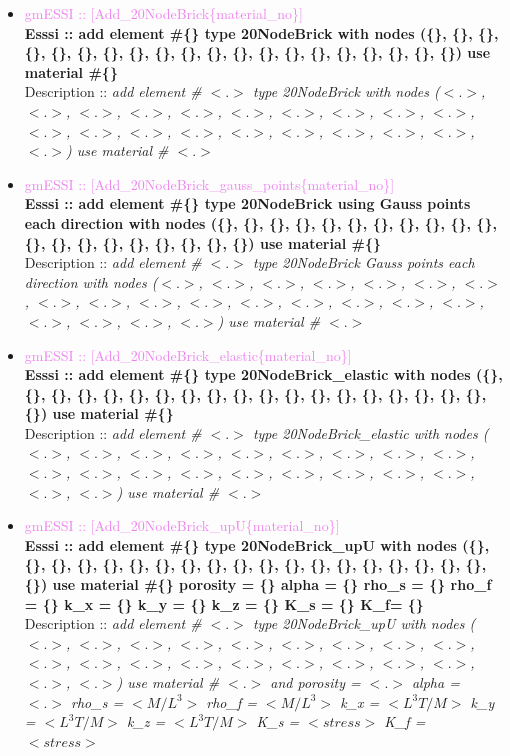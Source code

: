 \documentclass[11pt]{article}
\begin{document}
  \begin{itemize}

    \item \textcolor{violet}{gmESSI :: [Add\_20NodeBrick\{material\_no\}]} \\             
    \textbf{Esssi :: add element \#\{\} type 20NodeBrick with nodes (\{\}, \{\}, \{\}, \{\}, \{\}, \{\}, \{\}, \{\}, \{\}, \{\}, \{\}, \{\}, \{\}, \{\}, \{\}, \{\}, \{\}, \{\}, \{\}, \{\}) use material \#\{\}}\\
    Description :: \textit{ add element \# $<.>$ type 20NodeBrick with nodes ($<.>$, $<.>$, $<.>$, $<.>$, $<.>$, $<.>$, $<.>$, $<.>$, $<.>$, $<.>$, $<.>$, $<.>$, $<.>$, $<.>$, $<.>$, $<.>$, $<.>$, $<.>$, $<.>$, $<.>$) use material \# $<.>$}

    \item \textcolor{violet}{gmESSI :: [Add\_20NodeBrick\_gauss\_points\{material\_no\}]} \\     
    \textbf{Esssi :: add element \#\{\} type 20NodeBrick using  Gauss points each direction with nodes (\{\}, \{\}, \{\}, \{\}, \{\}, \{\}, \{\}, \{\}, \{\}, \{\}, \{\}, \{\}, \{\}, \{\}, \{\}, \{\}, \{\}, \{\}, \{\}, \{\}) use material \#\{\}}\\
    Description :: \textit{ add element \# $<.>$ type 20NodeBrick Gauss points each direction with nodes ($<.>$, $<.>$, $<.>$, $<.>$, $<.>$, $<.>$, $<.>$, $<.>$, $<.>$, $<.>$, $<.>$, $<.>$, $<.>$, $<.>$, $<.>$, $<.>$, $<.>$, $<.>$, $<.>$, $<.>$) use material \# $<.>$}

    \item \textcolor{violet}{gmESSI :: [Add\_20NodeBrick\_elastic\{material\_no\}]} \\     
    \textbf{Esssi :: add element \#\{\} type 20NodeBrick\_elastic with nodes (\{\}, \{\}, \{\}, \{\}, \{\}, \{\}, \{\}, \{\}, \{\}, \{\}, \{\}, \{\}, \{\}, \{\}, \{\}, \{\}, \{\}, \{\}, \{\}, \{\}) use material \#\{\}}\\
    Description :: \textit{ add element \# $<.>$ type 20NodeBrick\_elastic with nodes ($<.>$, $<.>$, $<.>$, $<.>$, $<.>$, $<.>$, $<.>$, $<.>$, $<.>$, $<.>$, $<.>$, $<.>$, $<.>$, $<.>$, $<.>$, $<.>$, $<.>$, $<.>$, $<.>$, $<.>$) use material \# $<.>$}

    \item \textcolor{violet}{gmESSI :: [Add\_20NodeBrick\_upU\{material\_no\}]} \\     
    \textbf{Esssi :: add element \#\{\} type 20NodeBrick\_upU with nodes (\{\}, \{\}, \{\}, \{\}, \{\}, \{\}, \{\}, \{\}, \{\}, \{\}, \{\}, \{\}, \{\}, \{\}, \{\}, \{\}, \{\}, \{\}, \{\}, \{\}) use material \#\{\} porosity = \{\} alpha = \{\} rho\_s = \{\} rho\_f = \{\} k\_x = \{\} k\_y = \{\} k\_z = \{\} K\_s = \{\} K\_f= \{\}}\\
    Description :: \textit{ add element \# $<.>$ type 20NodeBrick\_upU with nodes ($<.>$, $<.>$, $<.>$, $<.>$, $<.>$, $<.>$, $<.>$, $<.>$, $<.>$, $<.>$, $<.>$, $<.>$, $<.>$, $<.>$, $<.>$, $<.>$, $<.>$, $<.>$, $<.>$, $<.>$) use material \# $<.>$ and porosity = $<.>$ alpha = $<.>$  rho\_s = $<M/L^3>$  rho\_f = $<M/L^3>$ k\_x = $<L^3T/M>$  k\_y = $<L^3T/M>$  k\_z = $<L^3T/M>$  K\_s = $<stress>$ K\_f = $<stress>$}


\end{itemize}
\end{document}
